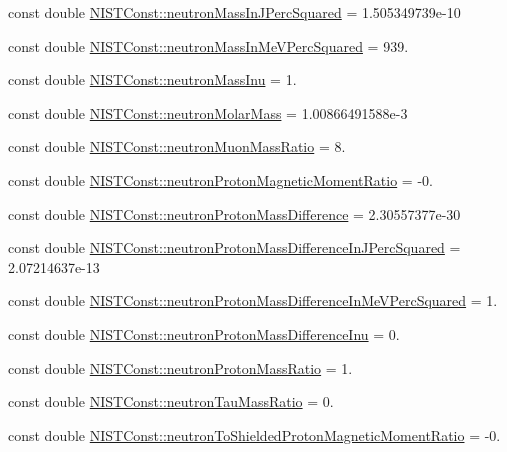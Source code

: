 \begin{DoxyCompactItemize}
\item 
const double \hyperlink{group___neutron_ga28892913d6ed40673a170941f79bb86e}{N\+I\+S\+T\+Const\+::neutron\+Mass\+In\+J\+Perc\+Squared} = 1.\+505349739e-\/10
\item 
const double \hyperlink{group___neutron_ga53f986a22e4dcb31cc8ed8151fd18a8e}{N\+I\+S\+T\+Const\+::neutron\+Mass\+In\+Me\+V\+Perc\+Squared} = 939.
\item 
const double \hyperlink{group___neutron_ga7931fb41eb5f1acf4b94d9d6b92ca4c3}{N\+I\+S\+T\+Const\+::neutron\+Mass\+Inu} = 1.
\item 
const double \hyperlink{group___neutron_ga0f7ab7fc272f54c17ecf777efff7003b}{N\+I\+S\+T\+Const\+::neutron\+Molar\+Mass} = 1.\+00866491588e-\/3
\item 
const double \hyperlink{group___neutron_ga91ae8b70076ca6001d2141d1df72a39c}{N\+I\+S\+T\+Const\+::neutron\+Muon\+Mass\+Ratio} = 8.
\item 
const double \hyperlink{group___neutron_ga98c2f64e48dbd352a997b82d8815daba}{N\+I\+S\+T\+Const\+::neutron\+Proton\+Magnetic\+Moment\+Ratio} = -\/0.
\item 
const double \hyperlink{group___neutron_ga95ef0427b50433511707f0949fc503b9}{N\+I\+S\+T\+Const\+::neutron\+Proton\+Mass\+Difference} = 2.\+30557377e-\/30
\item 
const double \hyperlink{group___neutron_gaa89b2b23475d809d4d3a4c46e7556b71}{N\+I\+S\+T\+Const\+::neutron\+Proton\+Mass\+Difference\+In\+J\+Perc\+Squared} = 2.\+07214637e-\/13
\item 
const double \hyperlink{group___neutron_gae96854e1fcd14f08cc92a060c6690730}{N\+I\+S\+T\+Const\+::neutron\+Proton\+Mass\+Difference\+In\+Me\+V\+Perc\+Squared} = 1.
\item 
const double \hyperlink{group___neutron_ga570caff89957976a8486d25e5288df51}{N\+I\+S\+T\+Const\+::neutron\+Proton\+Mass\+Difference\+Inu} = 0.
\item 
const double \hyperlink{group___neutron_gad8a08222b3de2105b5b399faa5a59fbd}{N\+I\+S\+T\+Const\+::neutron\+Proton\+Mass\+Ratio} = 1.
\item 
const double \hyperlink{group___neutron_ga9c3ba7b26cbcc0b2f7f7fa551812683a}{N\+I\+S\+T\+Const\+::neutron\+Tau\+Mass\+Ratio} = 0.
\item 
const double \hyperlink{group___neutron_ga7446ad6eb4c1e0b8167d1a1ff5c4cd89}{N\+I\+S\+T\+Const\+::neutron\+To\+Shielded\+Proton\+Magnetic\+Moment\+Ratio} = -\/0.
\end{DoxyCompactItemize}


